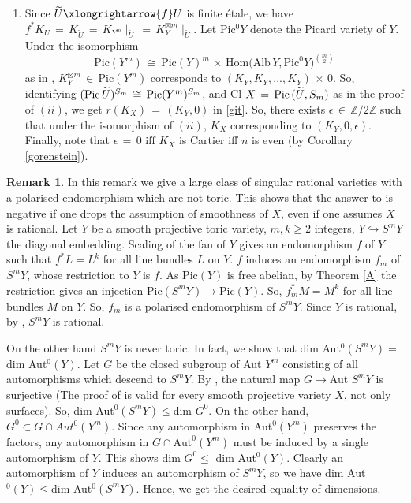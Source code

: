 \documentclass[12pt,reqno]{amsart}
\theoremstyle{definition}
\newtheorem{remark}[lemma]{Remark}
\numberwithin{equation}{section}
\begin{document}
\begin{enumerate}
\item[$(iii)$] Since  $ \widetilde{U}\xlongrightarrow{f} U$ is finite {\'e}tale, we have $ f^{\ast}K_{U}\,=\, K_{\widetilde{U}}\,=\, {K_{Y^{m}}}\mid_{\widetilde{U}} \,=\,K_{Y}^{\boxtimes m} \mid_{\widetilde{U}}.$ Let Pic$^0Y$ denote the Picard variety of $Y$. Under the isomorphism $$ \text{Pic}(Y^m)\,\cong\, \text{Pic}(Y)^m\,\times\, \text{Hom(Alb}\, Y,  \text{Pic}^0Y)^{\binom{m}{2}}$$ as in \cite{Fo}, $K_{Y}^{\boxtimes m}\,\in\, \text{Pic}(Y^m)$ corresponds to $(K_Y, K_Y,...,K_Y)\,\times\, \underline{0}$. So, identifying $(\textnormal{Pic}\, \widetilde{U})^{S_{m}}\,\cong\, \text{Pic}(Y^m)^{S_{m}}$, and Cl $X\,=\,\textnormal{Pic}\,(\widetilde{U},S_{m})$ as in the proof of $(ii)$, we get $r(K_X)\,=\,(K_Y, 0)$ in \eqref{git}. So, there exists $\epsilon\, \in\, {\mathbb{Z}/2 \mathbb{Z}}$ such that under the isomorphism of $(ii)$, $K_{X}$ corresponding to $(K_{Y}, 0, \epsilon).$ Finally, note that $ \epsilon\,=\,0\text{ iff } K_{X}$ is Cartier iff $n$ is even (by Corollary \ref{gorenstein}). 
\end{enumerate}
\begin{remark}
    In this remark we give a large class of singular rational varieties with a polarised endomorphism which are not toric. This shows that the answer to {\cite[Question 4.4]{Fa}} is negative if one drops the assumption of smoothness of $X$, even if one assumes $X$ is rational. Let $Y$ be a smooth projective toric variety, $m, k\geq 2$ integers, $Y\hookrightarrow S^m Y$ the diagonal embedding. Scaling of the fan of $Y$ gives an endomorphism $f$ of $Y$ such that $f^* L=L^k$ for all line bundles $L$ on $Y$. $f$ induces an endomorphism $f_m$ of $S^mY$, whose restriction to $Y$ is $f$. As $\text{Pic}(Y)$ is free abelian, by Theorem \ref{A} the restriction gives an injection $\text{Pic}(S^mY)\to\text{Pic}(Y)$. So, $f_m^* M=M^k$ for all line bundles $M$ on $Y$. So, $f_m$ is a polarised endomorphism of $S^mY.$ Since $Y$ is rational, by \cite{Ma}, $S^m Y$ is rational.

    On the other hand $S^m Y$ is never toric. In fact, we show that dim Aut$^0(S^m Y)=$dim  Aut$^0(Y)$. Let $G$ be the closed subgroup of Aut $Y^m$ consisting of all automorphisms which descend to $S^m Y$. By {\cite[Proposition 9 and 12]{belmans2020automorphisms}}, the natural map $G\to $Aut $S^mY$ is surjective (The proof of {\cite[Proposition 9 and 12]{belmans2020automorphisms}} is valid for every smooth projective variety $X$, not only surfaces). So, dim Aut$^0(S^m Y)\leq$dim $G^0$. On the other hand, $G^0\subset G\cap Aut^0(Y^m)$. Since any automorphism in Aut$^0(Y^m)$ preserves the factors, any automorphism in $G\cap \text{Aut}^0(Y^m)$ must be induced by a single automorphism of $Y$. This shows dim $G^0\leq$ dim Aut$^0(Y)$. Clearly an automorphism of $Y$ induces an automorphism of $S^m Y$, so we have dim Aut$^0(Y)\leq $dim Aut$^0(S^m Y)$. Hence, we get the desired equality of dimensions.
\end{remark}
\end{document}
